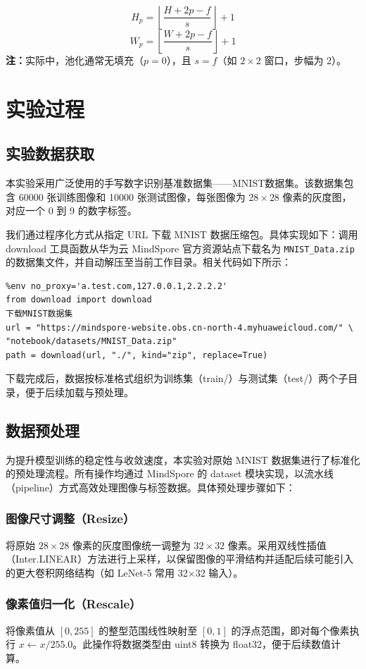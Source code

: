 \documentclass[12pt]{article}
\begin{document}
$$
H_p = \left\lfloor \frac{H + 2p - f}{s} \right\rfloor + 1
$$
$$
W_p = \left\lfloor \frac{W + 2p - f}{s} \right\rfloor + 1
$$
\textbf{注：}实际中，池化通常无填充（$p = 0$），且 $s = f$（如 $2\times2$ 窗口，步幅为 2）。

\section{实验过程}
\subsection{实验数据获取}
本实验采用广泛使用的手写数字识别基准数据集——MNIST数据集。该数据集包含 60000 张训练图像和 10000 张测试图像，每张图像为 $28 \times 28$ 像素的灰度图，对应一个 0 到 9 的数字标签。\par

我们通过程序化方式从指定 URL 下载 MNIST 数据压缩包。具体实现如下：调用 download 工具函数从华为云 MindSpore 官方资源站点下载名为 \texttt{MNIST\_Data.zip} 的数据集文件，并自动解压至当前工作目录。相关代码如下所示：
\begin{lstlisting}
%env no_proxy='a.test.com,127.0.0.1,2.2.2.2'
from download import download
下载MNIST数据集
url = "https://mindspore-website.obs.cn-north-4.myhuaweicloud.com/" \
"notebook/datasets/MNIST_Data.zip"
path = download(url, "./", kind="zip", replace=True)
\end{lstlisting}
下载完成后，数据按标准格式组织为训练集（train/）与测试集（test/）两个子目录，便于后续加载与预处理。

\subsection{数据预处理}
为提升模型训练的稳定性与收敛速度，本实验对原始 MNIST 数据集进行了标准化的预处理流程。所有操作均通过 MindSpore 的 dataset 模块实现，以流水线（pipeline）方式高效处理图像与标签数据。具体预处理步骤如下：
\subsubsection*{图像尺寸调整（Resize）}
将原始 $28 \times 28$ 像素的灰度图像统一调整为 $32 \times 32$ 像素。采用双线性插值（Inter.LINEAR）方法进行上采样，以保留图像的平滑结构并适配后续可能引入的更大卷积网络结构（如 LeNet-5 常用 32×32 输入）。

\subsubsection*{像素值归一化（Rescale）}
将像素值从 $[0, 255]$ 的整型范围线性映射至 $[0, 1]$ 的浮点范围，即对每个像素执行 $x \leftarrow x / 255.0$。此操作将数据类型由 uint8 转换为 float32，便于后续数值计算。
\end{document}
